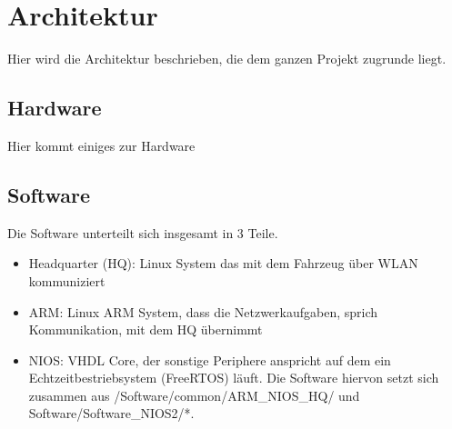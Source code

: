 \chapter{Architektur}
Hier wird die Architektur beschrieben, die dem ganzen Projekt zugrunde liegt.
\section{Hardware}
Hier kommt einiges zur Hardware 
\section{Software}
Die Software unterteilt sich insgesamt in 3 Teile.
\begin{itemize}
 \item Headquarter (HQ): Linux System das mit dem Fahrzeug über WLAN kommuniziert
 \item ARM: Linux ARM System, dass die Netzwerkaufgaben, sprich Kommunikation, mit dem HQ übernimmt
 \item NIOS: VHDL Core, der sonstige Periphere anspricht auf dem ein Echtzeitbestriebsystem (FreeRTOS) läuft. Die Software hiervon setzt sich zusammen aus /Software/common/ARM\_NIOS\_HQ/ und Software/Software\_NIOS2/*.
\end{itemize}

